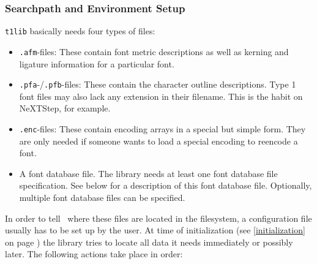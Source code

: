 \subsubsection{Searchpath and Environment Setup}
\verb+t1lib+ basically needs four types of files:
\begin{itemize}
\item \verb+.afm+-files: These contain font metric descriptions as
  well as kerning and ligature information for a particular font.
\item \verb+.pfa+-/\verb+.pfb+-files: These contain the character
  outline descriptions. Type 1 font files may also lack any extension in their
  filename. This is the habit on NeXTStep, for example.
\item \verb+.enc+-files: These contain encoding arrays in a special but
  simple form. They are only  needed if someone wants to load a special
  encoding to reencode a font.
\item A font database file. The library needs at least one font
  database file specification. See below for a description of this
  font database file. Optionally, multiple font database files can be
  specified.
\end{itemize}
In order to tell \tonelib\ where these files are located in the
filesystem, a configuration file usually has to be set up by the user.  
At time of initialization (see \ref{initialization} on page
\pageref{initialization}) the library tries to locate all data it
needs immediately or possibly later. The
following actions take place in order:
